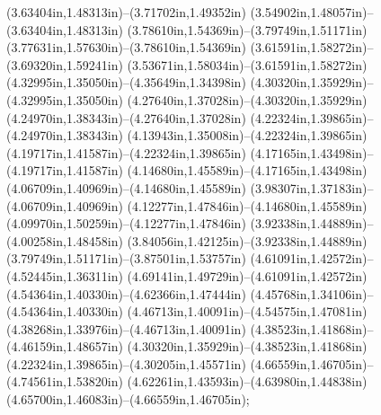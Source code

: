 (3.63404in,1.48313in)--(3.71702in,1.49352in) (3.54902in,1.48057in)--(3.63404in,1.48313in) (3.78610in,1.54369in)--(3.79749in,1.51171in) (3.77631in,1.57630in)--(3.78610in,1.54369in) (3.61591in,1.58272in)--(3.69320in,1.59241in) (3.53671in,1.58034in)--(3.61591in,1.58272in) (4.32995in,1.35050in)--(4.35649in,1.34398in) (4.30320in,1.35929in)--(4.32995in,1.35050in) (4.27640in,1.37028in)--(4.30320in,1.35929in) (4.24970in,1.38343in)--(4.27640in,1.37028in) (4.22324in,1.39865in)--(4.24970in,1.38343in) (4.13943in,1.35008in)--(4.22324in,1.39865in) (4.19717in,1.41587in)--(4.22324in,1.39865in) (4.17165in,1.43498in)--(4.19717in,1.41587in) (4.14680in,1.45589in)--(4.17165in,1.43498in) (4.06709in,1.40969in)--(4.14680in,1.45589in) (3.98307in,1.37183in)--(4.06709in,1.40969in) (4.12277in,1.47846in)--(4.14680in,1.45589in) (4.09970in,1.50259in)--(4.12277in,1.47846in) (3.92338in,1.44889in)--(4.00258in,1.48458in) (3.84056in,1.42125in)--(3.92338in,1.44889in) (3.79749in,1.51171in)--(3.87501in,1.53757in) (4.61091in,1.42572in)--(4.52445in,1.36311in) (4.69141in,1.49729in)--(4.61091in,1.42572in) (4.54364in,1.40330in)--(4.62366in,1.47444in) (4.45768in,1.34106in)--(4.54364in,1.40330in) (4.46713in,1.40091in)--(4.54575in,1.47081in) (4.38268in,1.33976in)--(4.46713in,1.40091in) (4.38523in,1.41868in)--(4.46159in,1.48657in) (4.30320in,1.35929in)--(4.38523in,1.41868in) (4.22324in,1.39865in)--(4.30205in,1.45571in) (4.66559in,1.46705in)--(4.74561in,1.53820in) (4.62261in,1.43593in)--(4.63980in,1.44838in) (4.65700in,1.46083in)--(4.66559in,1.46705in);
